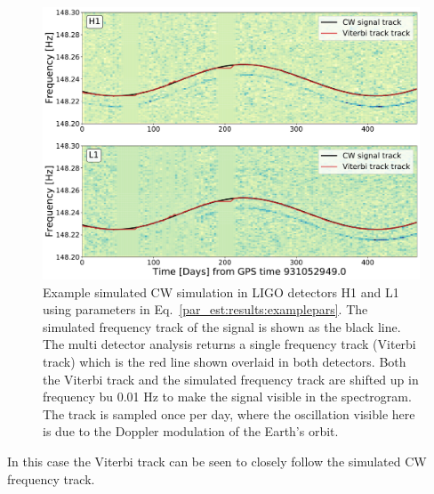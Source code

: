 \begin{figure}[ht]
    \centering
    \includegraphics[width=\linewidth]{C5_parameter/example_freqtrack.pdf}
    \caption[Frequency track of injected signal]{ Example simulated \gls{CW} simulation in \gls{LIGO} detectors H1 and L1 using parameters in Eq.~\ref{par_est:results:examplepars}. The simulated frequency track of the signal is shown as the black line. The multi detector analysis returns a single frequency track (Viterbi track) which is the red line shown overlaid in both detectors.
    Both the Viterbi track and the simulated frequency track are shifted up in frequency bu 0.01 Hz to make the signal visible in the spectrogram.
    The track is sampled once per day, where the oscillation visible here is due to the Doppler modulation of the Earth's orbit.} \label{par_est:results:freqtrack}    
\end{figure}
%
In this case the Viterbi track can be seen to closely follow the simulated
\gls{CW} frequency track.

